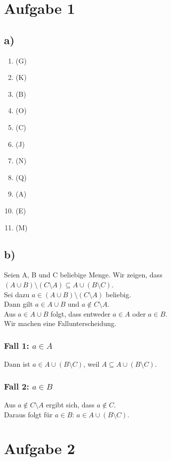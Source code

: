 \documentclass{article}
\begin{document}
\section*{Aufgabe 1}

\subsection*{a)}
\begin{enumerate}
\item (G)
\item (K)
\item (B)
\item (O)
\item (C) 
\item (J)
\item (N)
\item (Q)  
\item (A)
\item (E)
\item (M)
\end{enumerate}

\subsection*{b)}

Seien A, B und C beliebige Menge. Wir zeigen, dass $(A \cup B) \setminus (C \setminus A) \subseteq A \cup (B \setminus C)$. \\
Sei dazu $a \in (A \cup B) \setminus (C \setminus A)$ beliebig. \\
Dann gilt $a \in A \cup B$ und $a \notin C \setminus A$. \\
Aus $a \in A \cup B$ folgt, dass entweder $a \in A$ oder $a \in B$. \\
Wir machen eine Fallunterscheidung.
\subsubsection*{Fall 1: $a \in A$} 
Dann ist $a \in A \cup (B \setminus C)$, weil $A \subseteq A \cup (B \setminus C)$.

\subsubsection*{Fall 2: $a \in B$}
Aus $a \notin C \setminus A$ ergibt sich, dass $a \notin C$. \\
Daraus folgt für $a \in B$: $a \in A \cup (B \setminus C)$.


\section*{Aufgabe 2}
\end{document}
